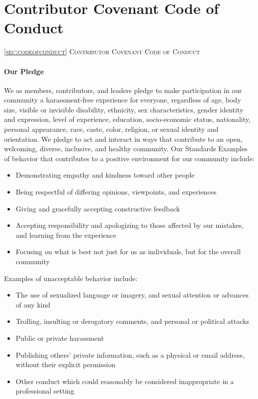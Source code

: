 \section{Contributor Covenant Code of Conduct\label{sec:codeofconduct}}
{\textsc{\ref{sec:codeofconduct} Contributor Covenant Code of Conduct}}

\paragraph{Our Pledge}
We as members, contributors, and leaders pledge to make participation in our
community a harassment-free experience for everyone, regardless of age, body
size, visible or invisible disability, ethnicity, sex characteristics, gender
identity and expression, level of experience, education, socio-economic status,
nationality, personal appearance, race, caste, color, religion, or sexual identity
and orientation.
We pledge to act and interact in ways that contribute to an open, welcoming,
diverse, inclusive, and healthy community.
Our Standards
Examples of behavior that contributes to a positive environment for our
community include:
\begin{itemize}
\item Demonstrating empathy and kindness toward other people
\item Being respectful of differing opinions, viewpoints, and experiences
\item Giving and gracefully accepting constructive feedback
\item Accepting responsibility and apologizing to those affected by our mistakes,
and learning from the experience
\item Focusing on what is best not just for us as individuals, but for the
overall community
\end{itemize}
Examples of unacceptable behavior include:
\begin{itemize}
\item The use of sexualized language or imagery, and sexual attention or
advances of any kind
\item Trolling, insulting or derogatory comments, and personal or political attacks
\item Public or private harassment
\item Publishing others’ private information, such as a physical or email
address, without their explicit permission
\item Other conduct which could reasonably be considered inappropriate in a
professional setting
\end{itemize}

